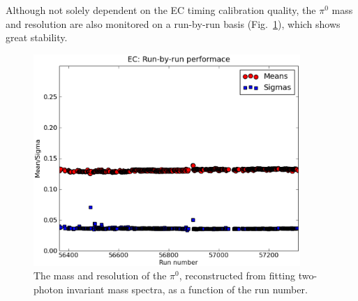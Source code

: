 Although not solely dependent on the EC timing calibration quality, the $\pi^0$ mass and resolution are also monitored on a run-by-run basis (Fig.~\ref{ecpi0m}), which shows great stability.

\begin{figure}[h]
\begin{center}
 \includegraphics[width=0.9\textwidth]{figures/calib/ec/ec_pi0mass.eps}
  \caption{The mass and resolution of the $\pi^0$, reconstructed from fitting two-photon invariant mass spectra, as a function of the run number.}
  \label{ecpi0m}
  \end{center}
\end{figure}
%
%
%
%
\FloatBarrier
